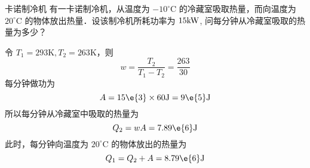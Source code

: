 \begin{example}{卡诺制冷机}
有一卡诺制冷机，从温度为 $-10^{\circ} \mathrm{C}$ 的冷藏室吸取热量，而向温度为 $20^{\circ} \mathrm{C}$ 的物体放出热量．设该制冷机所耗功率为 $15\rm kW$, 问每分钟从冷藏室吸取的热量为多少？

令 $T_1 = 293 \mathrm K , T_2 = 263 \mathrm K $，则
\begin{equation}
w=\frac{T_{2}}{T_{1}-T_{2}}=\frac{263}{30}
\end{equation}
每分钟做功为
\begin{equation}
A=15\e{3} \times 60 \mathrm{J}=9\e{5} \mathrm{J}
\end{equation}
所以每分钟从冷藏室中吸取的热量为
\begin{equation}
Q_{2}=w A=7.89\e{6} \mathrm{J}
\end{equation}
此时，每分钟向温度为 $20^{\circ} \mathrm{C}$ 的物体放出的热量为
\begin{equation}
Q_{1}=Q_{2}+A=8.79\e{6} \mathrm{J}
\end{equation}

\end{example}